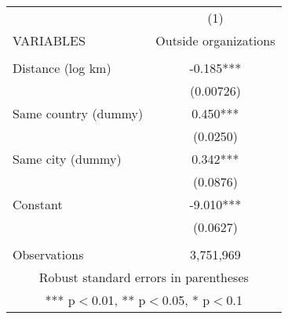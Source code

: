 \begin{tabular}{lc} \hline
 & (1) \\
VARIABLES & Outside organizations \\ \hline
 &  \\
Distance (log km) & -0.185*** \\
 & (0.00726) \\
Same country (dummy) & 0.450*** \\
 & (0.0250) \\
Same city (dummy) & 0.342*** \\
 & (0.0876) \\
Constant & -9.010*** \\
 & (0.0627) \\
 &  \\
 Observations & 3,751,969 \\ \hline
\multicolumn{2}{c}{ Robust standard errors in parentheses} \\
\multicolumn{2}{c}{ *** p$<$0.01, ** p$<$0.05, * p$<$0.1} \\
\end{tabular}
